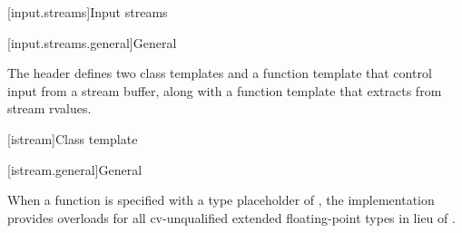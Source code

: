 [input.streams]{Input streams}

[input.streams.general]{General}

\pnum
The header  defines two class templates
and a function template that control input from a stream buffer,
along with a function template that extracts from stream rvalues.

[istream]{Class template }

[istream.general]{General}

\pnum
When a function is specified
with a type placeholder of ,
the implementation provides overloads
for all cv-unqualified extended floating-point types
in lieu of .

